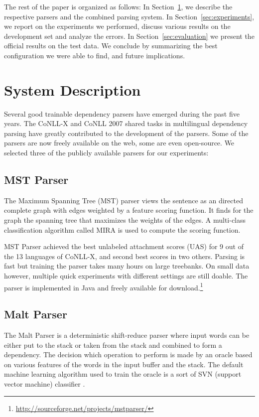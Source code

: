 \documentclass[11pt]{article}
\def\Sref#1{Section~\ref{#1}}
\def\microsection#1{{\bf #1.}}
\begin{document}
The rest of the paper is organized as follows: In \Sref{sec:system}, we describe the respective parsers and the combined parsing system. In \Sref{sec:experiments}, we report on the experiments we performed, discuss various results on the development set and analyze the errors. In \Sref{sec:evaluation} we present the official results on the test data. We conclude by summarizing the best configuration we were able to find, and future implications.

\section{System Description}
\label{sec:system}

Several good trainable dependency parsers have emerged during the past five years. The CoNLL-X \citep{buchholz-marsi:2006:CoNLL-X} and CoNLL 2007 \citep{nivre-EtAl:2007:EMNLP-CoNLL2007} shared tasks in multilingual dependency parsing have greatly contributed to the development of the parsers. Some of the parsers are now freely available on the web, some are even open-source. We selected three of the publicly available parsers for our experiments:

\subsection{MST Parser}
\label{sec:mst}
The Maximum Spanning Tree (MST) parser \citep{mst} views the sentence as an directed complete graph with edges weighted by a feature scoring function. It finds for the graph the spanning tree that maximizes the weights of the edges. A multi-class classification algorithm called MIRA is used to compute the scoring function.

MST Parser achieved the best unlabeled attachment scores (UAS) for 9 out of the 13 languages of CoNLL-X, and second best scores in two others. Parsing is fast but training the parser takes many hours on large treebanks. On small data however, multiple quick experiments with different settings are still doable. The parser is implemented in Java and freely available for download.\footnote{\url{http://sourceforge.net/projects/mstparser/}}

\subsection{Malt Parser}
\label{sec:malt}
The Malt Parser  \citep{malt} is a deterministic shift-reduce parser where input words can be either put to the stack or taken from the stack and combined to form a dependency. The decision which operation to perform is made by an oracle based on various features of the words in the input buffer and the stack. The default machine learning algorithm used to train the oracle is a sort of SVN (support vector machine) classifier \citep{svm}.
\end{document}
